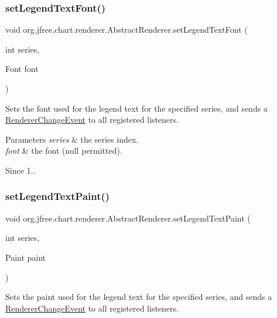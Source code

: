 \subsubsection{\texorpdfstring{set\+Legend\+Text\+Font()}{setLegendTextFont()}}
{\footnotesize\ttfamily void org.\+jfree.\+chart.\+renderer.\+Abstract\+Renderer.\+set\+Legend\+Text\+Font (\begin{DoxyParamCaption}\item[{int}]{series,  }\item[{Font}]{font }\end{DoxyParamCaption})}

Sets the font used for the legend text for the specified series, and sends a \mbox{\hyperlink{}{Renderer\+Change\+Event}} to all registered listeners.


\begin{DoxyParams}{Parameters}
{\em series} & the series index. \\
\hline
{\em font} & the font ({\ttfamily null} permitted).\\
\hline
\end{DoxyParams}
\begin{DoxySince}{Since}
1.. 
\end{DoxySince}
\mbox{\label{classorg_1_1jfree_1_1chart_1_1renderer_1_1_abstract_renderer_a78ea34d0e7c713aa876d24686a80edb0}} 
\subsubsection{\texorpdfstring{set\+Legend\+Text\+Paint()}{setLegendTextPaint()}}
{\footnotesize\ttfamily void org.\+jfree.\+chart.\+renderer.\+Abstract\+Renderer.\+set\+Legend\+Text\+Paint (\begin{DoxyParamCaption}\item[{int}]{series,  }\item[{Paint}]{paint }\end{DoxyParamCaption})}

Sets the paint used for the legend text for the specified series, and sends a \mbox{\hyperlink{}{Renderer\+Change\+Event}} to all registered listeners.


